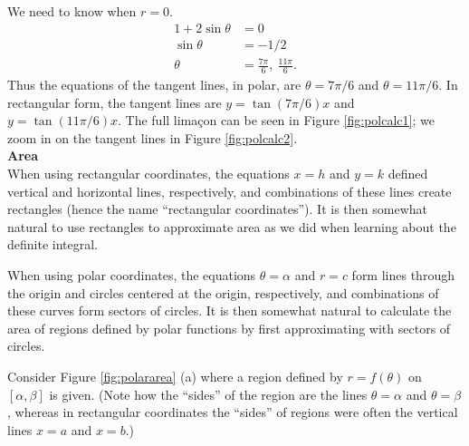 {We need to know when $r=0$. 
\begin{align*}
1+2\sin\theta &= 0\\
\sin\theta &= -1/2\\
\theta &= \frac{7\pi}{6},\ \frac{11\pi}6.
\end{align*}
Thus the equations of the tangent lines, in polar, are $\theta = 7\pi/6$ and $\theta = 11\pi/6$. In rectangular form, the tangent lines are $y=\tan(7\pi/6)x$ and $y=\tan(11\pi/6)x$. The full lima\c con can be seen in Figure \ref{fig:polcalc1}; we zoom in on the tangent lines in Figure \ref{fig:polcalc2}.
}\\

\noindent\textbf{\large Area}\\

When using rectangular coordinates, the equations $x=h$ and $y=k$ defined vertical and horizontal lines, respectively, and combinations of these lines create rectangles (hence the name ``rectangular coordinates''). It is then somewhat natural to use rectangles to approximate area as we did when learning about the definite integral.

When using polar coordinates, the equations $\theta=\alpha$ and $r=c$ form lines through the origin and circles centered at the origin, respectively, and combinations of these curves form sectors of circles. It is then somewhat natural to calculate the area of regions defined by polar functions by first approximating with sectors of circles. 

Consider Figure \ref{fig:polararea} (a) where a region defined by $r=f(\theta)$ on $[\alpha,\beta]$ is given. (Note how the ``sides'' of the region are the lines $\theta=\alpha$ and $\theta=\beta$, whereas in rectangular coordinates the ``sides'' of regions were often the vertical lines $x=a$ and $x=b$.)

